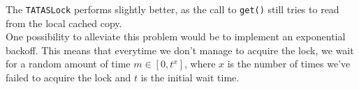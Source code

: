 \documentclass[main]{subfiles}
\begin{document}
The \texttt{TATASLock} performs slightly better, as the call to \texttt{get()} still tries to read from the local cached copy.\\[3mm]
One possibility to alleviate this problem would be to implement an exponential backoff. This means that everytime we don't manage to acquire the lock, we wait for a random amount of time $m \in [0,t^x]$, where $x$ is the number of times we've failed to acquire the lock and $t$ is the initial wait time.

\newpage

\end{document}
